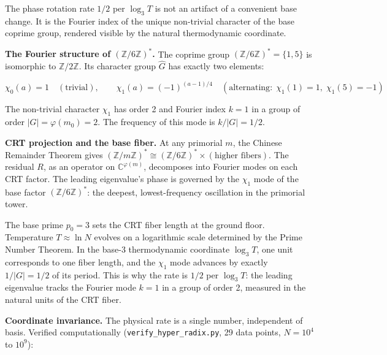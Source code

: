 \documentclass[
  11pt,
]{article}
\numberwithin{equation}{section}
\begin{document}
The phase rotation rate \(1/2\) per \(\log_3 T\) is not an artifact of a
convenient base change. It is the Fourier index of the unique
non-trivial character of the base coprime group, rendered visible by the
natural thermodynamic coordinate.

\textbf{The Fourier structure of \((\mathbb{Z}/6\mathbb{Z})^*\).} The
coprime group \((\mathbb{Z}/6\mathbb{Z})^* = \{1, 5\}\) is isomorphic to
\(\mathbb{Z}/2\mathbb{Z}\). Its character group \(\widehat{G}\) has
exactly two elements:

\begin{equation}\chi_0(a) = 1 \quad (\text{trivial}), \qquad \chi_1(a) = (-1)^{(a-1)/4} \quad (\text{alternating}: \; \chi_1(1) = 1, \; \chi_1(5) = -1)\end{equation}

The non-trivial character \(\chi_1\) has order 2 and Fourier index
\(k = 1\) in a group of order \(|G| = \varphi(m_0) = 2\). The frequency
of this mode is \(k/|G| = 1/2\).

\textbf{CRT projection and the base fiber.} At any primorial \(m\), the
Chinese Remainder Theorem gives
\((\mathbb{Z}/m\mathbb{Z})^* \cong (\mathbb{Z}/6\mathbb{Z})^* \times (\text{higher fibers})\).
The residual \(R\), as an operator on \(\mathbb{C}^{\varphi(m)}\),
decomposes into Fourier modes on each CRT factor. The leading
eigenvalue's phase is governed by the \(\chi_1\) mode of the base factor
\((\mathbb{Z}/6\mathbb{Z})^*\): the deepest, lowest-frequency
oscillation in the primorial tower.

The base prime \(p_0 = 3\) sets the CRT fiber length at the ground
floor. Temperature \(T \approx \ln N\) evolves on a logarithmic scale
determined by the Prime Number Theorem. In the base-3 thermodynamic
coordinate \(\log_3 T\), one unit corresponds to one fiber length, and
the \(\chi_1\) mode advances by exactly \(1/|G| = 1/2\) of its period.
This is why the rate is \(1/2\) per \(\log_3 T\): the leading eigenvalue
tracks the Fourier mode \(k = 1\) in a group of order 2, measured in the
natural units of the CRT fiber.

\textbf{Coordinate invariance.} The physical rate is a single number,
independent of basis. Verified computationally
(\texttt{verify\_hyper\_radix.py}, 29 data points, \(N = 10^4\) to
\(10^9\)):
\end{document}
